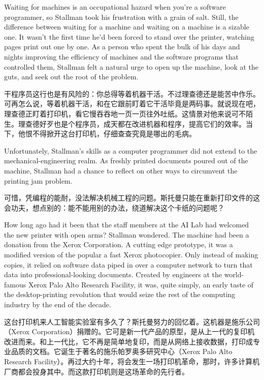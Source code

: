 \ifdefined\eng
Waiting for machines is an occupational hazard when you're a software programmer, so Stallman took his frustration with a grain of salt. Still, the difference between waiting for a machine and waiting on a machine is a sizable one. It wasn't the first time he'd been forced to stand over the printer, watching pages print out one by one. As a person who spent the bulk of his days and nights improving the efficiency of machines and the software programs that controlled them, Stallman felt a natural urge to open up the machine, look at the guts, and seek out the root of the problem.
\fi

\ifdefined\chs
干程序员这行也是有风险的：你总得等着机器干活。不过理查德还是能苦中作乐。可再怎么说，等着机器干活，和在它跟前盯着它干活毕竟是两码事。就说现在吧，理查德正盯着打印机，看它慢吞吞地一页一页往外吐纸。这情景对他来说可不陌生。理查德好歹也是个程序员，成天都在改进机器和程序，提高它们的效率。当下，他恨不得掀开这台打印机，仔细查查究竟是哪出的毛病。
\fi

\ifdefined\eng
Unfortunately, Stallman's skills as a computer programmer did not extend to the mechanical-engineering realm. As freshly printed documents poured out of the machine, Stallman had a chance to reflect on other ways to circumvent the printing jam problem.
\fi

\ifdefined\chs
可惜，凭编程的能耐，没法解决机械工程的问题。斯托曼只能在重新打印文件的这会功夫，想点别的：能不能用别的办法，绕道解决这个卡纸的问题呢？
\fi

\ifdefined\eng
How long ago had it been that the staff members at the AI Lab had welcomed the new printer with open arms? Stallman wondered. The machine had been a donation from the Xerox Corporation. A cutting edge prototype, it was a modified version of 
\ifdefined\vone
the popular
\fi
\ifdefined\vtwo
a fast
\fi
Xerox photocopier. Only instead of making copies, it relied on software data piped in over a computer network to turn that data into professional-looking documents. Created by engineers at the world-famous Xerox Palo Alto Research Facility, it was, quite simply, an early taste of the desktop-printing revolution that would seize the rest of the computing industry by the end of the decade.
\fi

\ifdefined\chs
这台打印机来人工智能实验室有多久了？斯托曼努力的回忆着。这机器是施乐公司（Xerox Corporation）捐赠的。它可是新一代产品的原型，是从上一代的复印机改进而来。和上一代比，它不再是简单地复印，而是从网络上接收数据，打印成专业品质的文档。它诞生于著名的施乐帕罗奥多研究中心（Xerox Palo Alto Research Facility）。再过大约十年，将会发生一场打印机革命，那时，许多计算机厂商都会投身其中。而这款打印机则是这场革命的先行者。
\fi

